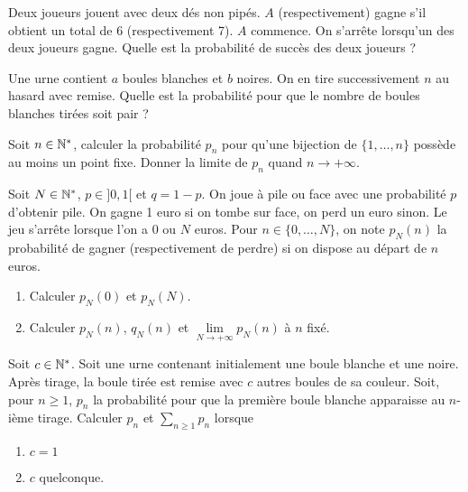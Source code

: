 \documentclass[12pt]{article}
\begin{document}
\begin{exercise}
	Deux joueurs jouent avec deux dés non pipés. $A$ (respectivement) gagne s'il
	obtient un total de 6 (respectivement 7). $A$ commence. On s'arrête lorsqu'un
	des deux joueurs gagne. Quelle est la probabilité de succès des deux joueurs ?
\end{exercise}

\begin{exercise}
	Une urne contient $a$ boules blanches et $b$ noires. On en tire successivement
	$n$ au hasard avec remise. Quelle est la probabilité pour que le nombre de
	boules blanches tirées soit pair ?
\end{exercise}

\begin{exercise}
	Soit $n\in\mathbb{N}^{*}$, calculer la probabilité $p_{n}$ pour qu'une bijection de
	$\{1,\dots,n\}$ possède au moins un point fixe. Donner la limite de $p_{n}$
	quand $n\to+\infty$.
\end{exercise}

\begin{exercise}
	Soit $N\in\mathbb{N}^{*}$, $p\in]0,1[$ et $q=1-p$. On joue à pile ou face avec une
	probabilité $p$ d'obtenir pile. On gagne 1 euro si on tombe sur face, on perd
	un euro sinon. Le jeu s'arrête lorsque l'on a 0 ou $N$ euros. Pour
	$n\in\{0,\dots,N\}$, on note $p_{N}(n)$ la probabilité de gagner
	(respectivement de perdre) si on dispose au départ de $n$ euros.
	\begin{enumerate}
		\item
		Calculer $p_{N}(0)$ et $p_{N}(N)$.
		\item
		Calculer $p_{N}(n)$, $q_{N}(n)$ et $\lim\limits_{N\to+\infty}p_{N}(n)$ à
		$n$ fixé.
	\end{enumerate}
\end{exercise}

\begin{exercise}
	Soit $c\in\mathbb{N}^{*}$. Soit une urne contenant initialement une boule blanche et
	une noire. Après tirage, la boule tirée est remise avec $c$ autres boules de
	sa couleur. Soit, pour $n\geqslant1$, $p_{n}$ la probabilité pour que la
	première boule blanche apparaisse au $n$-ième tirage. Calculer $p_{n}$ et
	$\sum_{n\geqslant1}p_{n}$ lorsque 
	\begin{enumerate}
		\item
		$c=1$
		\item
		$c$ quelconque.
	\end{enumerate}
\end{exercise}
\end{document}

